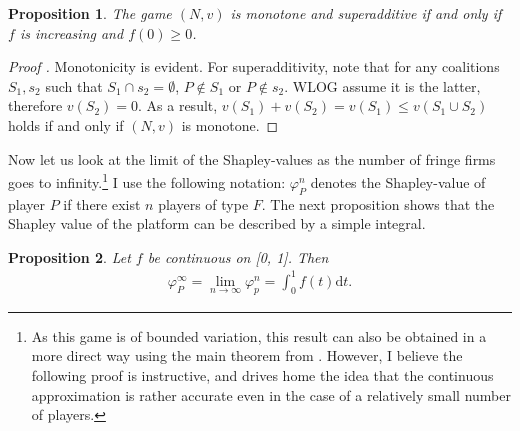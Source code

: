\documentclass[a4paper]{article}
\newtheorem{proposition}{Proposition}
\newcommand{\dt}{\mathrm{d}t}
\begin{document}
\begin{proposition}
    \label{prop:monotone}
    The game $(N, v)$ is monotone and superadditive if and only if $f$ is increasing and $f(0) \geq 0$. %
\end{proposition}

\begin{proof}[Proof%
    ]
    Monotonicity is evident. For superadditivity, note that for any coalitions $S_1, s_2$ such that $S_1 \cap s_2 = \emptyset$, $P \notin S_1$ or $P \notin s_2$. WLOG assume it is the latter, therefore $v(S_2) = 0$. As a result, $v(S_1) + v(S_2) = v(S_1) \leq v(S_1 \cup S_2)$ holds if and only if $(N, v)$ is monotone.
\end{proof}

Now let us look at the limit of the Shapley-values as the number of fringe firms goes to infinity.\footnote{
    As this game is of bounded variation, this result can also be obtained in a more direct way using the main theorem from \textcite{fogelman1980asymptotic}.
    However, I believe the following proof is instructive, and drives home the idea that the continuous approximation is rather accurate even in the case of a relatively small number of players.
}
I use the following notation: $\varphi_P^n$ denotes the Shapley-value of player $P$ if there exist $n$ players of type $F$.
The next proposition shows that the Shapley value of the platform can be described by a simple integral.

\begin{proposition}
    \label{prop:one_sided}
    Let $f$ be continuous on [0, 1]. Then
    \begin{align*}
        \varphi_P^\infty = \lim_{n \to \infty} \varphi_p^n = \int_0^1 f(t) \dt .
    \end{align*}
\end{proposition}
\end{document}
